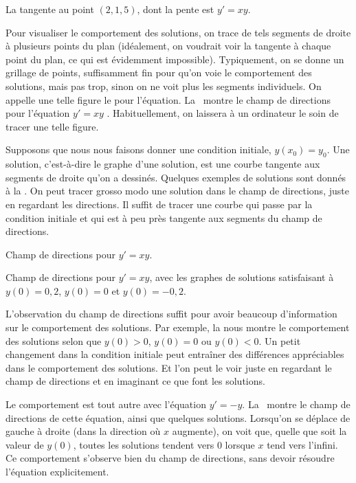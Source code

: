 \begin{myfig}
	\capstart {}
	\caption{La  tangente au point $(2 , 1,5)$, dont la pente est $y'=xy.$\label{1.3:fig0}}
\end{myfig}

Pour visualiser le comportement des solutions, on trace de tels segments de droite à plusieurs points du plan
(idéalement, on voudrait voir la tangente à chaque point du plan, ce qui est évidemment impossible).
Typiquement, on se donne un grillage de points, suffisamment fin pour qu'on voie le comportement des solutions,
mais pas trop, sinon on ne voit plus les segments individuels.
On appelle une telle figure le \emph{} pour l'équation.
La~ montre le champ de directions pour l'équation  $y' = xy$ .
Habituellement, on laissera à un ordinateur le soin de tracer une telle figure.

Supposons que nous nous faisons donner une condition initiale, $y(x_0) = y_0$.
Une solution, c'est-à-dire le graphe d'une solution, est une courbe tangente aux segments de droite qu'on a dessinés.
Quelques exemples de solutions sont donnés à la  .
On peut tracer grosso modo une solution dans le champ de directions, juste en regardant les directions.
Il suffit de tracer une courbe qui passe par la condition initiale et qui est à peu près tangente aux segments du champ de directions.

\begin{myfig}
	\parbox[t]{3.0in}{
	 \capstart 	 {}
	 \caption{Champ de directions pour $y' = xy$.\label{1.3:fig1}}
	}
	\quad
	\parbox[t]{3.0in}{
	 \capstart 	 {}
	 \caption{Champ de directions pour $y' = xy$, avec les graphes de solutions satisfaisant à $y(0) = 0,2$, $y(0) = 0$ et $y(0) = -0,2$.\label{1.3:fig2}}
	}
\end{myfig}
L'observation du champ de directions suffit pour avoir beaucoup d'information sur le comportement des solutions.
Par exemple, la  nous montre le comportement des solutions selon que $y(0) > 0$, $y(0) = 0$ ou $y(0) < 0$.
Un petit changement dans la condition initiale peut entraîner des différences appréciables dans le comportement des solutions.
Et l'on peut le voir juste en regardant le champ de directions et en imaginant ce que font les solutions.

Le comportement est tout autre avec l'équation $y' = -y$.
La~ montre le champ de directions de cette équation, ainsi que quelques solutions.
Lorsqu'on se déplace de gauche à droite (dans la direction où $x$ augmente), on voit que, quelle que soit la valeur de $y(0)$,
toutes les solutions tendent vers 0 lorsque $x$ tend vers l'infini.
Ce comportement s'observe bien du champ de directions, sans devoir résoudre l'équation explicitement.

